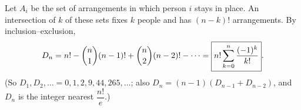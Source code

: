 Let $A_i$ be the set of arrangements in which person $i$ stays in place. An intersection of $k$ of these sets fixes $k$ people and has $(n-k)!$ arrangements. By inclusion--exclusion,
\[D_n=n!-\dbinom n1(n-1)!+\dbinom n2(n-2)!-\cdots=\boxed{n!\sum_{k=0}^n\dfrac{(-1)^k}{k!}}.\]
(So $D_1,D_2,\dots=0,1,2,9,44,265,\dots$; also $D_n=(n-1)(D_{n-1}+D_{n-2})$, and $D_n$ is the integer nearest $\dfrac{n!}{e}$.)
